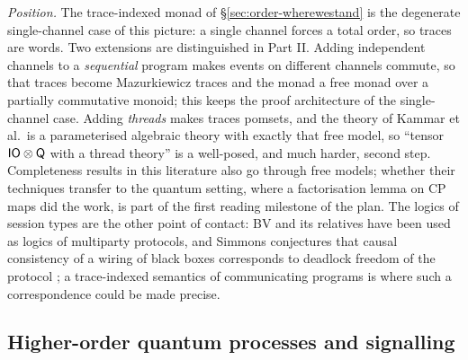 \emph{Position.} The trace-indexed monad of \S\ref{sec:order-wherewestand} is the degenerate single-channel case of this picture: a single channel forces a total order, so traces are words. Two extensions are distinguished in Part II. Adding independent channels to a \emph{sequential} program makes events on different channels commute, so that traces become Mazurkiewicz traces and the monad a free monad over a partially commutative monoid; this keeps the proof architecture of the single-channel case. Adding \emph{threads} makes traces pomsets, and the theory of Kammar et al.\ is a parameterised algebraic theory with exactly that free model, so ``tensor $\mathsf{IO}\otimes\mathsf{Q}$ with a thread theory'' is a well-posed, and much harder, second step. Completeness results in this literature also go through free models; whether their techniques transfer to the quantum setting, where a factorisation lemma on CP maps did the work, is part of the first reading milestone of the plan. The logics of session types are the other point of contact: BV and its relatives have been used as logics of multiparty protocols, and Simmons conjectures that causal consistency of a wiring of black boxes corresponds to deadlock freedom of the protocol \cite{simmons2024thesis}; a trace-indexed semantics of communicating programs is where such a correspondence could be made precise.

\subsection{Higher-order quantum processes and signalling}\label{sec:hoqc}

